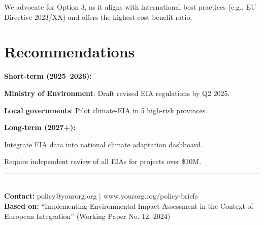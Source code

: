 \documentclass[a4paper,11pt]{article}
\begin{document}
We advocate for Option 3, as it aligns with international best practices (e.g., EU Directive 2023/XX) and offers the highest cost-benefit ratio.

\section*{Recommendations}
\textbf{Short-term (2025–2026):}
\item \textbf{Ministry of Environment}: Draft revised EIA regulations by Q2 2025.
    \item \textbf{Local governments}: Pilot climate-EIA in 5 high-risk provinces.

\textbf{Long-term (2027+):}
\item Integrate EIA data into national climate adaptation dashboard.
    \item Require independent review of all EIAs for projects over \$10M.

\vspace{2em}
\noindent\rule{\textwidth}{0.4pt}\\
\footnotesize
\textbf{Contact:} policy@yourorg.org \quad | \quad www.yourorg.org/policy-briefs \\
\textbf{Based on:} “Implementing Environmental Impact Assessment in the Context of European Integration” (Working Paper No. 12, 2024)
\end{document}
